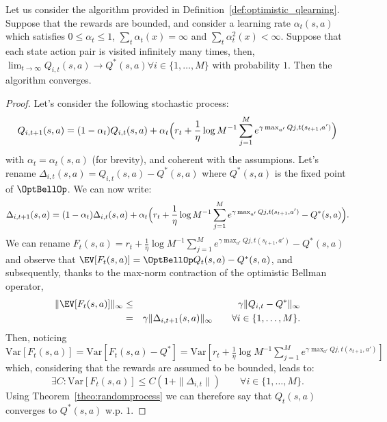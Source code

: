 \begin{theorem}
	Let us consider the algorithm provided in Definition~\ref{def:optimistic_qlearning}. Suppose that the rewards are bounded, and consider a learning rate $\alpha_t(s,a)$ which satisfies $0 \leq \alpha_t \leq 1$, $\sum_t \alpha_t(x)  = \infty$ and $\sum_t \alpha^2_t(x) < \infty$. Suppose that each state action pair is visited infinitely many times, then, $\lim_{t\to \infty} Q_{i,t}(s,a) \to Q^*(s,a) \forall i \in \{1,\dots,M\}$ with probability $1$. 
	Then the algorithm converges.
	\begin{proof}
		Let's consider the following stochastic process:
		\begin{equation}
		Q_{i, t+1}(s,a) = (1-\alpha_t)Q_{i,t}(s,a)  + \alpha_t \Bigl(r_t + \frac{1}{\eta} \log M^{-1} \sum_{j=1}^M e^{\gamma \max_{a'} Q{j,t}(s_{t+1}, a')}\Bigr) \nonumber
		\end{equation}
		with $\alpha_t = \alpha_t(s,a)$ (for brevity), and coherent with the assumpions.
		Let's rename  $\Delta_{i,t}(s,a) = Q_{i, t}(s,a) - Q^*(s,a)$ where $Q^*(s,a)$ is the fixed point of $\OptBellOp$. We can now write:
		\begin{equation}
		\Delta_{i,t+1}(s,a) = (1-\alpha_t)\Delta_{i,t}(s,a)  + \alpha_t \Bigl(r_t + \frac{1}{\eta} \log M^{-1} \sum_{j=1}^M e^{\gamma \max_{a'} Q{j,t}(s_{t+1}, a')} - Q^*(s,a)\Bigr) . \nonumber \\
		\end{equation}
		We can rename $F_t(s,a) = r_t + \frac{1}{\eta} \log M^{-1} \sum_{j=1}^M e^{\gamma \max_{a'} Q{j,t}(s_{t+1}, a')} - Q^*(s,a)$ and observe that $\EV[F_t(s,a)]  = \OptBellOp Q_t(s,a) - Q^*(s,a)$, and subsequently, thanks to the max-norm contraction of the optimistic Bellman operator,
		\begin{eqnarray}
		\| \EV[F_t(s,a)] \|_{\infty} & \leq & \gamma \| Q_{i,t} - Q^*\|_{\infty} \nonumber \\
		& = & \gamma \| \Delta_{i,t+1}(s,a) \|_{\infty} \quad \quad \forall i \in \{1,\dots,M\}.\nonumber
		\end{eqnarray}
		Then, noticing $\mathrm{Var}[F_{t}(s,a)] = \mathrm{Var}[F_{t}(s,a) - Q^*] = \mathrm{Var}[r_t + \frac{1}{\eta} \log M^{-1} \sum_{j=1}^M e^{\gamma \max_{a'} Q{j,t}(s_{t+1}, a')}]$ which, considering that the rewards are assumed to be bounded, leads to:
		\begin{equation}
		\exists C : \mathrm{Var}[F_{t}(s,a)] \leq C (1 + \|\Delta_{i,t}\|) \quad \quad \forall i \in \{1, \dots, M\}.
		\end{equation}
		Using Theorem~\ref{theo:randomprocess} we can therefore say that $Q_t(s,a)$ converges to $Q^*(s,a)$ w.p. $1$.
	\end{proof}
\end{theorem}

